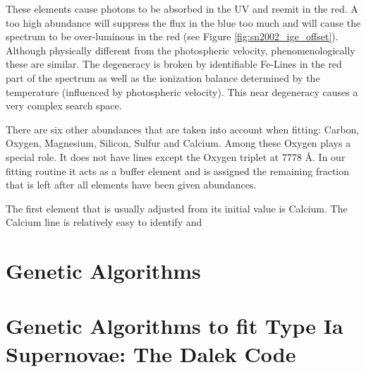 These elements cause photons to be absorbed in the UV and reemit in the red. A too high abundance will suppress the flux in the blue too much and will cause the spectrum to be over-luminous in the red (see Figure \ref{fig:sn2002_ige_offset}). Although physically different from the photospheric velocity, phenomenologically these are similar. 
The degeneracy is broken by identifiable Fe-Lines in the red part of the spectrum as well as the ionization balance determined by the temperature (influenced by photospheric velocity). 
This near degeneracy causes a very complex search space. 

There are six other abundances that are taken into account when fitting: Carbon, Oxygen, Magnesium, Silicon, Sulfur and Calcium. Among these Oxygen plays a special role. It does not have lines except the Oxygen triplet at 7778 \AA. In our fitting routine it acts as a buffer element and is assigned the remaining fraction that is left after all elements have been given abundances. 

The first element that is usually adjusted from its initial value is Calcium. The Calcium line is relatively easy to identify and 

\section{Genetic Algorithms}



\section{Genetic Algorithms to fit Type Ia Supernovae: The Dalek Code}








